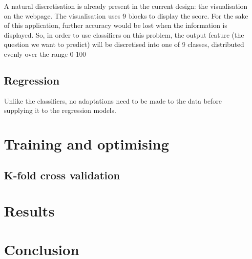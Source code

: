 A natural discretisation is already present in the current design: the visualisation on the webpage. The visualisation uses 9 blocks to display the score. For the sake of this application, further accuracy would be lost when the information is displayed. So, in order to use classifiers on this problem, the output feature (the question we want to predict) will be discretised into one of 9 classes, distributed evenly over the range 0-100%


\subsection{Regression}
Unlike the classifiers, no adaptations need to be made to the data before supplying it to the regression models.


\section{Training and optimising}

\subsection{K-fold cross validation}

\section{Results}

\section{Conclusion}

